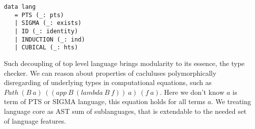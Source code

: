 \begin{lstlisting}[mathescape=true]
data lang
   = PTS (_: pts)
   | SIGMA (_: exists)
   | ID (_: identity)
   | INDUCTION (_: ind)
   | CUBICAL (_: hts)
\end{lstlisting}

Such decoupling of top level language brings modularity to its essence,
the type checker. We can reason about properties of cacluluses polymorphically
disregarding of underlying types in computational equations, such as
$Path\ (B\ a)\ ((app\ B\ (lambda\ B\ f))\ a)\ (f\ a)$. Here we don't know $a$ is
term of PTS or SIGMA language, this equation holds for all terms $a$.
We treating language core as AST sum of sublanguages, that is
extendable to the needed set of language features.
